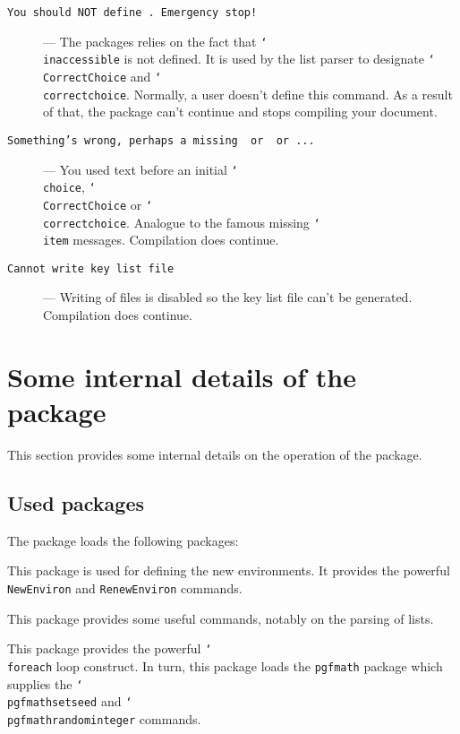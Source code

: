 \documentclass[12pt,a4paper]{exam}
\providecommand{\texorpdfstring}[2]{#1}
\newcommand{\bs}{\texorpdfstring{\char`\\}{}}
\begin{document}
\begin{description}
\item[\texttt{You should NOT define \string\inaccessible. Emergency stop!}] ---
The packages relies on the fact that \texttt{\bs inaccessible} is not defined. It is
used by the list parser to designate \texttt{\bs CorrectChoice} and
\texttt{\bs correctchoice}. Normally, a user doesn't define this command.
As a result of that, the package can't continue and stops compiling your document.


\item[\texttt{Something's wrong, perhaps a missing \string\choice\ or \string\CorrectChoice\ or ...}] --- You used text before an initial \texttt{\bs choice}, \texttt{\bs CorrectChoice}
or \texttt{\bs correctchoice}. Analogue to the famous missing \texttt{\bs item} messages.
Compilation does continue.
 
\item[\texttt{Cannot write key list file}] --- Writing of files is disabled so the key list file can't be generated. Compilation does continue.
 
\end{description}



\section{Some internal details of the package}
This section provides some internal details on the operation of the package.

\subsection{Used packages}
The package loads the following packages:

\begin{description}[labelindent=2ex]
\item[\texttt{environ}] This package is used for defining the new environments. It provides
the powerful \texttt{NewEnviron} and \texttt{RenewEnviron} commands.
\item[\texttt{etoolbox}] This package provides some useful commands, notably on the parsing of lists.
\item[\texttt{pgffor}] This package provides the powerful \texttt{\bs foreach} loop
construct. In turn, this package loads the \texttt{pgfmath} package which supplies
the \texttt{\bs pgfmathsetseed} and \linebreak \texttt{\bs pgfmathrandominteger} commands.
\end{description}
\end{document}
